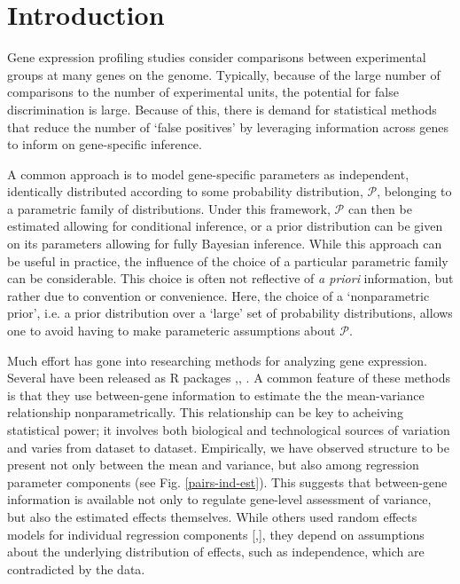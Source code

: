 \newcommand{\ind}{\stackrel{ind.}{\sim}}
\newcommand{\op}{\operatorname}
\newcommand{\code}{\texttt}

\section{Introduction}
Gene expression profiling studies consider comparisons between experimental groups at many genes on the genome. Typically, because of the large number of comparisons to the number of experimental units, the potential for false discrimination is large. Because of this, there is demand for statistical methods that reduce the number of `false positives' by leveraging information across genes to inform on gene-specific inference.


A common approach is to model gene-specific parameters as independent, identically distributed according to some probability distribution, $\mathcal{P}$, belonging to a parametric family of distributions. Under this framework, $\mathcal{P}$ can then be estimated allowing for conditional inference, or a prior distribution can be given on its parameters allowing for fully Bayesian inference. While this approach can be useful in practice, the influence of the choice of a particular parametric family can be considerable. This choice is often not reflective of \textit{a priori} information, but rather due to convention or convenience. Here, the choice of a `nonparametric prior', i.e. a prior distribution over a `large' set of probability distributions, allows one to avoid having to make parameteric assumptions about $\mathcal{P}$. 

Much effort has gone into researching methods for analyzing gene expression. Several have been released as R packages \citep{edger2010},\citep{deseq2014}, \citep{voom}. A common feature of these methods is that they use between-gene information to estimate the the  mean-variance relationship nonparametrically. This relationship can be key to acheiving statistical power; it involves both biological and technological sources of variation and varies from dataset to dataset\cite{voom}. Empirically, we have observed structure to be present not only between the mean and variance, but also among regression parameter components (see Fig. \ref{pairs-ind-est}). This suggests that between-gene information is available not only to regulate gene-level assessment of variance, but also the estimated effects themselves. While others used random effects models for individual regression components [\citep{deseq2014},\citep{landau}], they depend on assumptions about the underlying distribution of effects, such as independence, which are contradicted by the data.

